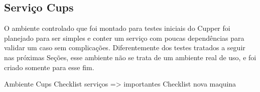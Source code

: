 \subsection{Serviço Cups}
O ambiente controlado que foi montado para testes iniciais do Cupper foi planejado
para ser simples e conter um serviço com poucas dependências para validar um caso
sem complicações. Diferentemente dos testes tratados a seguir nas próximas Seções,
esse ambiente não se trata de um ambiente real de uso, e foi criado somente para
esse fim.

Ambiente Cups
Checklist serviços => importantes
Checklist nova maquina
